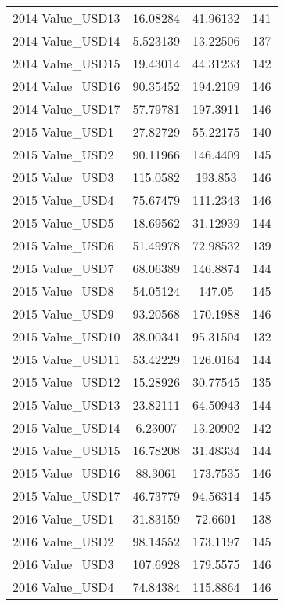 {\begin{tabular}{l*{1}{ccc}}
2014 Value\_USD13    &    16.08284&    41.96132&         141\\
2014 Value\_USD14    &    5.523139&    13.22506&         137\\
2014 Value\_USD15    &    19.43014&    44.31233&         142\\
2014 Value\_USD16    &    90.35452&    194.2109&         146\\
2014 Value\_USD17    &    57.79781&    197.3911&         146\\
2015 Value\_USD1     &    27.82729&    55.22175&         140\\
2015 Value\_USD2     &    90.11966&    146.4409&         145\\
2015 Value\_USD3     &    115.0582&     193.853&         146\\
2015 Value\_USD4     &    75.67479&    111.2343&         146\\
2015 Value\_USD5     &    18.69562&    31.12939&         144\\
2015 Value\_USD6     &    51.49978&    72.98532&         139\\
2015 Value\_USD7     &    68.06389&    146.8874&         144\\
2015 Value\_USD8     &    54.05124&      147.05&         145\\
2015 Value\_USD9     &    93.20568&    170.1988&         146\\
2015 Value\_USD10    &    38.00341&    95.31504&         132\\
2015 Value\_USD11    &    53.42229&    126.0164&         144\\
2015 Value\_USD12    &    15.28926&    30.77545&         135\\
2015 Value\_USD13    &    23.82111&    64.50943&         144\\
2015 Value\_USD14    &     6.23007&    13.20902&         142\\
2015 Value\_USD15    &    16.78208&    31.48334&         144\\
2015 Value\_USD16    &     88.3061&    173.7535&         146\\
2015 Value\_USD17    &    46.73779&    94.56314&         145\\
2016 Value\_USD1     &    31.83159&     72.6601&         138\\
2016 Value\_USD2     &    98.14552&    173.1197&         145\\
2016 Value\_USD3     &    107.6928&    179.5575&         146\\
2016 Value\_USD4     &    74.84384&    115.8864&         146\\

\end{tabular}}
